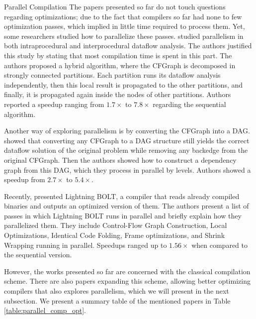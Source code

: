 \begin{section}{Parallel Compilation}
The papers presented so far do not touch questions regarding optimizations;
due to the fact that compilers so far had none to few optimization passes, which
implied in little time required to process them. Yet, some researchers studied
how to parallelize these passes. \cite{Lee1994} studied parallelism in both
intraprocedural and interprocedural dataflow analysis. The authors justified this
study by stating that most compilation time is spent in this part. The
authors proposed a hybrid algorithm, where the CFGraph is decomposed in
strongly connected partitions. Each partition runs its dataflow analysis
independently, then this local result is propagated to the other partitions,
and finally, it is propagated again inside the nodes of other
partitions. Authors reported a speedup ranging from $1.7\times$ to $7.8\times$
regarding the sequential algorithm.

Another way of exploring parallelism is by converting the CFGraph into a DAG.
\cite{kramer1994combining} showed that converting any CFGraph to a DAG
structure still yields the correct dataflow solution of the original problem
while removing any backedge from the original CFGraph. Then the authors showed
how to construct a dependency graph from this DAG, which they process in
parallel by levels. Authors showed a speedup from $2.7\times$ to $5.4\times$.


Recently, \cite{panchenko2021lightning} presented
Lightning BOLT, a compiler that reads already compiled binaries and outputs an
optimized version of them. The authors present a list of passes in which
Lightning BOLT runs in parallel and briefly explain how they parallelized them.
They include Control-Flow Graph Construction, Local Optimizations, Identical
Code Folding, Frame optimizations, and Shrink Wrapping running in parallel.
Speedups ranged up to $1.56\times$ when compared to the sequential version.

However, the works presented so far are concerned with the classical
compilation scheme. There are also papers expanding this scheme, allowing better
optimizing compilers that also explores parallelism, which we will present in
the next subsection. We present a summary table of the mentioned papers in
Table \ref{table:parallel_comp_opt}.


\end{section}
